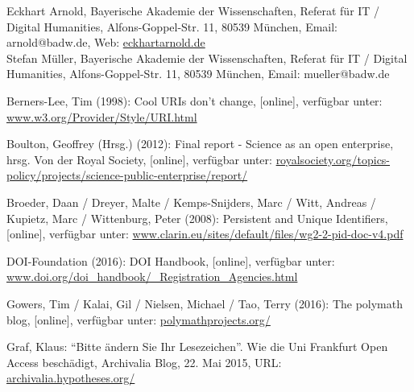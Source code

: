 \documentclass[12pt, a4paper]{article}
\begin{document}
Eckhart Arnold, Bayerische Akademie der Wissenschaften, Referat für IT
/ Digital Humanities, Alfons-Goppel-Str. 11, 80539 München, Email: arnold@badw.de, Web: \href{https://eckhartarnold.de}{eckhartarnold.de}\\[0.25cm]

Stefan Müller, Bayerische Akademie der Wissenschaften, Referat für IT
/ Digital Humanities, Alfons-Goppel-Str. 11, 80539 München, Email: mueller@badw.de


\begin{thebibliography}{99}

Berners-Lee, Tim (1998): Cool URIs don't
  change, {[}online{]}, verfügbar unter:
  \href{https://www.w3.org/Provider/Style/URI.html}{www.w3.org/\-Provider/\-Style/\-URI.html}

Boulton, Geoffrey (Hrsg.) (2012): Final report -
  Science as an open enterprise, hrsg. Von der Royal Society,
  {[}online{]}, verfügbar unter:
  \href{https://royalsociety.org/topics-policy/projects/science-public-enterprise/report/}{royalsociety.org/\-topics-policy/\-projects/\-science-public-enterprise/\-report/}

Broeder, Daan / Dreyer, Malte / Kemps-Snijders, Marc / Witt, Andreas /
Kupietz, Marc / Wittenburg, Peter (2008): Persistent and Unique
Identifiers, {[}online{]}, verfügbar unter:
\href{https://www.clarin.eu/sites/default/files/wg2-2-pid-doc-v4.pdf}{www.clarin.eu/\-sites/\-default/\-files/\-wg2-2-pid-doc-v4.pdf}

DOI-Foundation (2016): DOI Handbook,
  {[}online{]}, verfügbar unter:
  \href{http://www.doi.org/doi_handbook/8_Registration_Agencies.html}{www.doi.org/\-doi\_handbook/\_Registration\_Agencies.html}

Gowers, Tim / Kalai, Gil / Nielsen, Michael
  / Tao, Terry (2016): The polymath blog, {[}online{]}, verfügbar
  unter: \href{https://polymathprojects.org/}{polymathprojects.org/}

Graf, Klaus: ``Bitte ändern Sie Ihr Lesezeichen''. Wie die Uni Frankfurt Open Access beschädigt, Archivalia Blog, 22. Mai 2015, URL: \href{https://archivalia.hypotheses.org/1666}{archivalia.hypotheses.org/}


\end{thebibliography}
\end{document}
